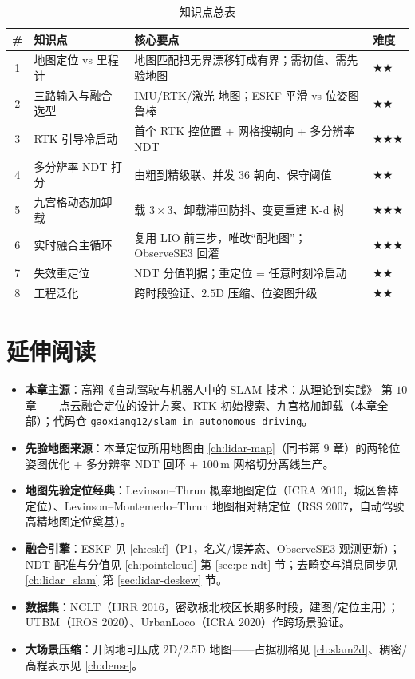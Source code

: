 \begin{table}[H]\centering\small
\caption{知识点总表}
\begin{tabular}{clll}
\toprule
\# & 知识点 & 核心要点 & 难度 \\
\midrule
1 & 地图定位 vs 里程计 & 地图匹配把无界漂移钉成有界；需初值、需先验地图 & $\bigstar\bigstar$ \\
2 & 三路输入与融合选型 & IMU/RTK/激光-地图；ESKF 平滑 vs 位姿图鲁棒 & $\bigstar\bigstar$ \\
3 & RTK 引导冷启动 & 首个 RTK 控位置 + 网格搜朝向 + 多分辨率 NDT & $\bigstar\bigstar\bigstar$ \\
4 & 多分辨率 NDT 打分 & 由粗到精级联、并发 $36$ 朝向、保守阈值 & $\bigstar\bigstar$ \\
5 & 九宫格动态加卸载 & 载 $3\times3$、卸载滞回防抖、变更重建 K-d 树 & $\bigstar\bigstar\bigstar$ \\
6 & 实时融合主循环 & 复用 LIO 前三步，唯改“配地图”；ObserveSE3 回灌 & $\bigstar\bigstar\bigstar$ \\
7 & 失效重定位 & NDT 分值判据；重定位 = 任意时刻冷启动 & $\bigstar\bigstar$ \\
8 & 工程泛化 & 跨时段验证、$2.5$D 压缩、位姿图升级 & $\bigstar\bigstar$ \\
\bottomrule
\end{tabular}
\end{table}

\section*{延伸阅读}
\begin{itemize}
  \item \textbf{本章主源}：高翔《自动驾驶与机器人中的 SLAM 技术：从理论到实践》\cite{gao2023slamad} 第 $10$ 章——点云融合定位的设计方案、RTK 初始搜索、九宫格加卸载（本章全部）；代码仓 \texttt{gaoxiang12/slam\_in\_autonomous\_driving}。
  \item \textbf{先验地图来源}：本章定位所用地图由 \cref{ch:lidar-map}（同书第 $9$ 章）的两轮位姿图优化 + 多分辨率 NDT 回环 + $100$\,m 网格切分离线生产。
  \item \textbf{地图先验定位经典}：Levinson--Thrun 概率地图定位\cite{levinson2010robust}（ICRA 2010，城区鲁棒定位）、Levinson--Montemerlo--Thrun 地图相对精定位\cite{levinson2007map}（RSS 2007，自动驾驶高精地图定位奠基）。
  \item \textbf{融合引擎}：ESKF 见 \cref{ch:eskf}（P1，名义/误差态、ObserveSE3 观测更新）；NDT 配准与分值见 \cref{ch:pointcloud} 第 \ref{sec:pc-ndt} 节；去畸变与消息同步见 \cref{ch:lidar_slam} 第 \ref{sec:lidar-deskew} 节。
  \item \textbf{数据集}：NCLT\cite{carlevaris2016nclt}（IJRR 2016，密歇根北校区长期多时段，建图/定位主用）；UTBM\cite{yan2020utbm}（IROS 2020）、UrbanLoco\cite{wen2020urbanloco}（ICRA 2020）作跨场景验证。
  \item \textbf{大场景压缩}：开阔地可压成 $2$D/$2.5$D 地图——占据栅格见 \cref{ch:slam2d}、稠密/高程表示见 \cref{ch:dense}。
\end{itemize}

